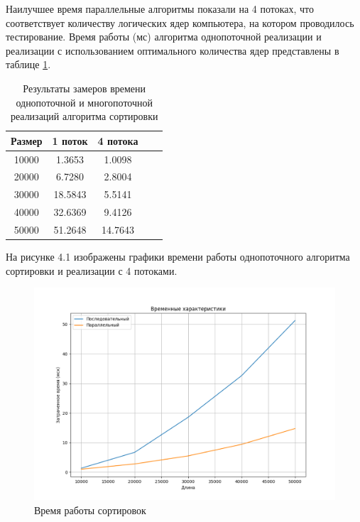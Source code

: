 Наилучшее время параллельные алгоритмы показали на 4 потоках, что соответствует количеству логических ядер компьютера, на котором проводилось тестирование. Время работы (мс) алгоритма однопоточной реализации и реализации с использованием оптимального количества ядер представлены в таблице \ref{tab:time2}.

\begin{table}[h]
	\begin{center}
		\caption{\label{tab:time2}Результаты замеров времени однопоточной и многопоточной реализаций алгоритма сортировки}
		\begin{tabular}{|c|c|c|c|c|}
		\hline
		Размер & 1 поток &  4 потока \\
		\hline
		10000 & 1.3653 & 1.0098 \\
		\hline
		20000 & 6.7280 & 2.8004 \\
		\hline
		30000 & 18.5843 & 5.5141 \\
		\hline
		40000 & 32.6369 & 9.4126 \\
		\hline
		50000 & 51.2648 & 14.7643 \\
		\hline
		\end{tabular}
	\end{center}
\end{table}

На рисунке 4.1 изображены графики времени работы однопоточного алгоритма сортировки и реализации с 4 потоками. 

\begin{figure}[h!]
	\centering
	\includegraphics[width=1\linewidth]{img/Plot2.png}
	\caption{Время работы сортировок}
	\label{fig:mpr}
\end{figure}

